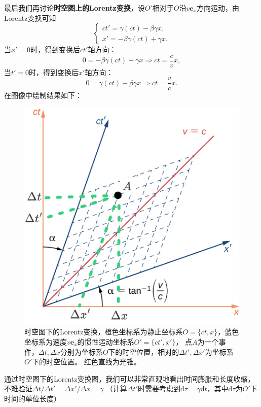 \documentclass[12pt, a4paper, oneside]{ctexart}
\numberwithin{equation}{section}  %
\def\bd{\boldsymbol}        %
\def\d{\mathrm{d}}          %
\begin{document}
最后我们再讨论\textbf{时空图上的Lorentz变换}，设$O'$相对于$O$沿$v\bd{e}_x$方向运动，由Lorentz变换可知
\begin{equation}
    \begin{cases}
        ct' = \gamma(ct) - \beta\gamma x,\\
        x' = -\beta\gamma(ct) + \gamma x.
    \end{cases}
\end{equation}
当$x' = 0$时，得到变换后$ct'$轴方向：
\begin{equation*}
0 = -\beta\gamma(ct) + \gamma x \Rightarrow ct = \frac{c}{v}x,
\end{equation*}
当$t' = 0$时，得到变换后$x'$轴方向：
\begin{equation*}
0 = \gamma(ct)-\beta \gamma x \Rightarrow ct = \frac{v}{c}x.
\end{equation*}
在图像中绘制结果如下：
\begin{figure}[htbp]
    \centering
    \includegraphics[scale=0.5]{spacetime_Lorentz_transform.png}
    \caption{时空图下的Lorentz变换，橙色坐标系为静止坐标系$O=\{ct,x\}$，蓝色坐标系为速度$v\bd{e}_x$的惯性运动坐标系$O'=\{ct',x'\}$，
    点$A$为一个事件，$\Delta t,\Delta x$分别为坐标系$O$下的时空位置，相对的$\Delta t',\Delta x'$为坐标系$O'$下的时空位置。
    红色直线为光锥。}
\end{figure}

通过时空图下的Lorentz变换图，我们可以非常直观地看出时间膨胀和长度收缩，不难验证$\Delta t / \Delta t' =\Delta x' / \Delta x = \gamma$
（计算$\Delta t'$时需要考虑到$\d \tau = \gamma \d t$，其中$\d\tau$为$O'$下时间的单位长度）
\end{document}
